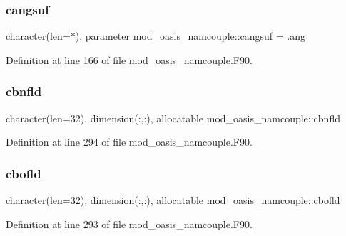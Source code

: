 \subsubsection{\texorpdfstring{cangsuf}{cangsuf}}
{\footnotesize\ttfamily character(len=$\ast$), parameter mod\+\_\+oasis\+\_\+namcouple\+::cangsuf = \textquotesingle{}.ang\textquotesingle{}\hspace{0.3cm}{\ttfamily [private]}}



Definition at line 166 of file mod\+\_\+oasis\+\_\+namcouple.\+F90.

\mbox{\label{namespacemod__oasis__namcouple_ab202dc43ea09f2b21fb0152c971a3e65}} 
\subsubsection{\texorpdfstring{cbnfld}{cbnfld}}
{\footnotesize\ttfamily character(len=32), dimension(\+:,\+:), allocatable mod\+\_\+oasis\+\_\+namcouple\+::cbnfld\hspace{0.3cm}{\ttfamily [private]}}



Definition at line 294 of file mod\+\_\+oasis\+\_\+namcouple.\+F90.

\mbox{\label{namespacemod__oasis__namcouple_a600d1a6024b9e5895ae4d53bbf465269}} 
\subsubsection{\texorpdfstring{cbofld}{cbofld}}
{\footnotesize\ttfamily character(len=32), dimension(\+:,\+:), allocatable mod\+\_\+oasis\+\_\+namcouple\+::cbofld\hspace{0.3cm}{\ttfamily [private]}}



Definition at line 293 of file mod\+\_\+oasis\+\_\+namcouple.\+F90.

\mbox{\label{namespacemod__oasis__namcouple_aa1ced7ffb831c65667b2d7b82e5b6187}} 
